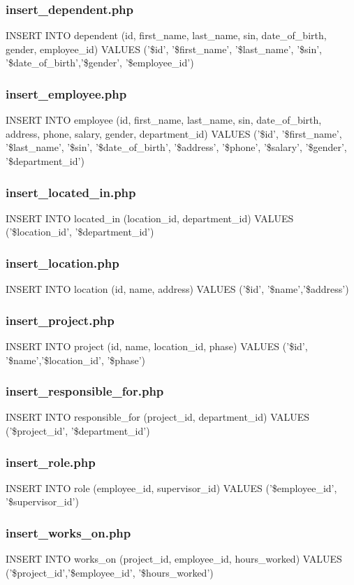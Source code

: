 \documentclass[11pt,letterpaper]{article}
\begin{document}
	\subsubsection{insert\_dependent.php}
	INSERT INTO dependent (id, first\_name, last\_name, sin, date\_of\_birth, gender, employee\_id) VALUES ('\$id', '\$first\_name', '\$last\_name', '\$sin', '\$date\_of\_birth','\$gender', '\$employee\_id')
	\subsubsection{insert\_employee.php}
	INSERT INTO employee (id, first\_name, last\_name, sin, date\_of\_birth, address, phone, salary, gender, department\_id) VALUES ('\$id', '\$first\_name', '\$last\_name', '\$sin', '\$date\_of\_birth', '\$address', '\$phone', '\$salary', '\$gender', '\$department\_id')
	\subsubsection{insert\_located\_in.php}
	INSERT INTO located\_in (location\_id, department\_id) VALUES ('\$location\_id', '\$department\_id')
	\subsubsection{insert\_location.php}
	INSERT INTO location (id, name, address) VALUES ('\$id', '\$name','\$address')
	\subsubsection{insert\_project.php}
	INSERT INTO project (id, name, location\_id, phase) VALUES ('\$id', '\$name','\$location\_id', '\$phase')
	\subsubsection{insert\_responsible\_for.php}
	INSERT INTO responsible\_for (project\_id, department\_id) VALUES ('\$project\_id', '\$department\_id')
	\subsubsection{insert\_role.php}
	INSERT INTO role (employee\_id, supervisor\_id) VALUES ('\$employee\_id', '\$supervisor\_id')
	\subsubsection{insert\_works\_on.php}
	INSERT INTO works\_on (project\_id, employee\_id, hours\_worked) VALUES ('\$project\_id','\$employee\_id', '\$hours\_worked')
	
\end{document}
